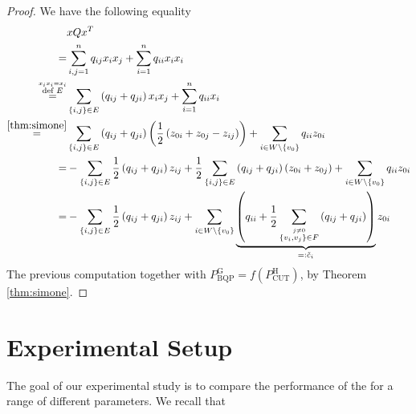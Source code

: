 \documentclass[12pt,a4paper]{article}
\theoremstyle{mythm}
\begin{document}
\begin{proof}
We have the following equality 
\begin{align*}
&x Q x ^T \\
=& \sum_{ i,j = 1 }^{ n } q _{ ij } x_i x_j + \sum_{ i = 1 }^{ n } q _{ ii } x_i x_{ i } \\
\overset{ \overset{ x_i x_i = x_i  }{ \text{def } E} }{ =}&  \sum_{ \left\{ i,j \right\} \in E  }^{  } \left( q _{ ij } + q _{ ji } \right) x_i x_j + \sum_{ i = 1 }^{ n } q
_{ ii } x_i \\
\overset{ \ref{thm:simone}  }{ =}& \sum_{ \left\{ i,j \right\} \in E  }^{  } \left( q _{ ij } + q _{ ji }  \right) \left( \frac{ 1 }{ 2 } \left( z _{ 0i } + z _{ 0j } - z _{
ij }  \right)  \right) + \sum_{ i \in W \setminus \left\{ v_0 \right\}   }^{  } q _{ ii } z _{ 0i } \\
=& -  \sum_{ \left\{ i,j \right\} \in E  }^{  } \frac{ 1 }{ 2 } \left( q _{ ij } + q _{ ji }  \right) z _{ ij } + 
\frac{ 1 }{ 2 } \sum_{  \left\{ i,j \right\}  \in E }^{ } \left( q _{ ij } +
q _{ ji }  \right) \left(  z _{ 0i } + z _{ 0j } \right) + \sum_{ i \in W \setminus \left\{ v_0 \right\}   }^{  } q _{ ii } z _{ 0i } \\
=& - \sum_{ \left\{ i,j \right\} \in E }^{  } \frac{ 1 }{ 2 } \left( q _{ ij } + q _{ ji }  \right) z _{ ij } + 
\sum_{ i \in W \setminus \left\{ v_0 \right\}   }^{  } \underbrace{ \left( q _{ ii } + \frac{ 1 }{ 2 } \sum_{ \overset{ j \neq 0  }{ \left\{ v_i , v_j \right\} \in F} }^{  }  \left( q _{
ij } + q _{ ji }  \right) \right) }_{ =: \tilde{ c } _i }  z _{ 0i } 
\end{align*} 
The previous computation together with $  P ^{ \text{G}  }  _{ \text{BQP}  } = f \left( P ^{ \text{H}  } _{ \text{CUT}  }  \right)    $, by Theorem \ref{thm:simone}.
\end{proof}

\section{Experimental Setup} 
The goal of our experimental study is to compare the performance of the \BH for a range of different parameters.
We recall that 
\end{document}
